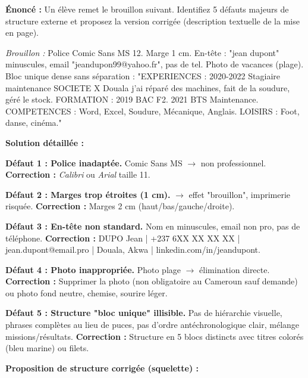 \documentclass[11pt]{article}
\begin{document}
\begin{exoresolu}
\textbf{Énoncé :} Un élève remet le brouillon suivant. Identifiez 5 défauts majeurs de structure externe et proposez la version corrigée (description textuelle de la mise en page).

\emph{Brouillon :} Police Comic Sans MS 12. Marge 1 cm. En-tête : "jean dupont" minuscules, email "jeandupon99@yahoo.fr", pas de tel. Photo de vacances (plage). Bloc unique dense sans séparation : "EXPERIENCES : 2020-2022 Stagiaire maintenance SOCIETE X Douala j'ai réparé des machines, fait de la soudure, géré le stock. FORMATION : 2019 BAC F2. 2021 BTS Maintenance. COMPETENCES : Word, Excel, Soudure, Mécanique, Anglais. LOISIRS : Foot, danse, cinéma."

\tcblower
\textbf{Solution détaillée :}

\noindent \textbf{Défaut 1 : Police inadaptée.} Comic Sans MS $\rightarrow$ non professionnel. \textbf{Correction :} \emph{Calibri} ou \emph{Arial} taille 11.

\noindent \textbf{Défaut 2 : Marges trop étroites (1 cm).} $\rightarrow$ effet "brouillon", imprimerie risquée. \textbf{Correction :} Marges 2 cm (haut/bas/gauche/droite).

\noindent \textbf{Défaut 3 : En-tête non standard.} Nom en minuscules, email non pro, pas de téléphone. \textbf{Correction :} \textsc{DUPO} Jean | +237 6XX XX XX XX | jean.dupont@email.pro | Douala, Akwa | linkedin.com/in/jeandupont.

\noindent \textbf{Défaut 4 : Photo inappropriée.} Photo plage $\rightarrow$ élimination directe. \textbf{Correction :} Supprimer la photo (non obligatoire au Cameroun sauf demande) ou photo fond neutre, chemise, sourire léger.

\noindent \textbf{Défaut 5 : Structure "bloc unique" illisible.} Pas de hiérarchie visuelle, phrases complètes au lieu de puces, pas d'ordre antéchronologique clair, mélange missions/résultats. \textbf{Correction :} Structure en 5 blocs distincts avec titres colorés (bleu marine) ou filets.

\noindent \textbf{Proposition de structure corrigée (squelette) :}


\end{exoresolu}
\end{document}
